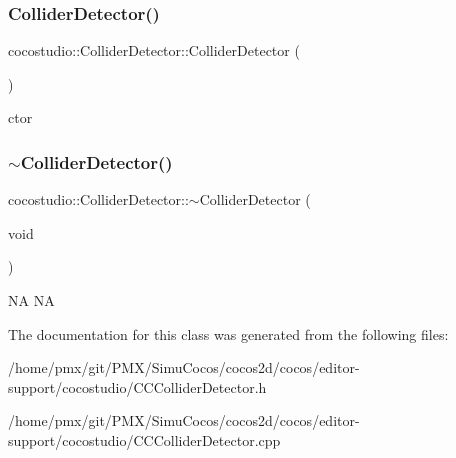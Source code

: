\subsubsection{\texorpdfstring{Collider\+Detector()}{ColliderDetector()}\hspace{0.1cm}{\footnotesize\ttfamily [2/2]}}
{\footnotesize\ttfamily cocostudio\+::\+Collider\+Detector\+::\+Collider\+Detector (\begin{DoxyParamCaption}{ }\end{DoxyParamCaption})}

ctor \mbox{\label{classcocostudio_1_1ColliderDetector_aff99ff5032b1f076b87c458cf2027908}} 
\subsubsection{\texorpdfstring{$\sim$\+Collider\+Detector()}{~ColliderDetector()}\hspace{0.1cm}{\footnotesize\ttfamily [2/2]}}
{\footnotesize\ttfamily cocostudio\+::\+Collider\+Detector\+::$\sim$\+Collider\+Detector (\begin{DoxyParamCaption}\item[{void}]{ }\end{DoxyParamCaption})}

NA  NA 

The documentation for this class was generated from the following files\+:\begin{DoxyCompactItemize}
\item 
/home/pmx/git/\+P\+M\+X/\+Simu\+Cocos/cocos2d/cocos/editor-\/support/cocostudio/C\+C\+Collider\+Detector.\+h\item 
/home/pmx/git/\+P\+M\+X/\+Simu\+Cocos/cocos2d/cocos/editor-\/support/cocostudio/C\+C\+Collider\+Detector.\+cpp\end{DoxyCompactItemize}
